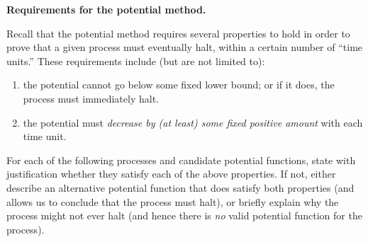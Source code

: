 \documentclass[11pt,addpoints,answers]{exam}
\begin{document}
\begin{questions}

    \question \textbf{Requirements for the potential method.}

  Recall that the potential method requires several properties to hold in order to prove that a given process must eventually halt, within a certain number of ``time units.''
  These requirements include (but are not limited to):
  \begin{enumerate}[itemsep=0pt]
  \item the potential cannot go below some fixed lower bound; or if it does, the process must immediately halt.
  \label{lower-bound}
  
  \item the potential must \emph{decrease by (at least) some fixed positive amount} with each time unit.\label{decrease}
  \end{enumerate}

  For each of the following processes and candidate potential functions, state with justification whether they satisfy each of the above properties.
  If not, either describe an alternative potential function that does satisfy both properties (and allows us to conclude that the process must halt), or briefly explain why the process might not ever halt (and hence there is \emph{no} valid potential function for the process).


\end{questions}
\end{document}
